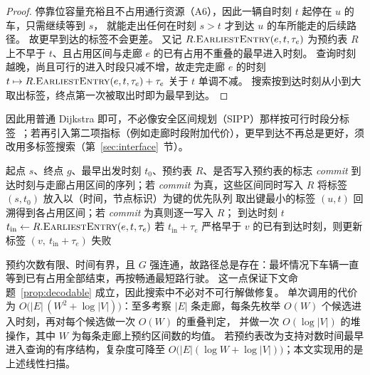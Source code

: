 \documentclass[manuscript,screen,review]{acmart}
\begin{document}
\begin{proof}
  停靠位容量充裕且不占用通行资源（A6），因此一辆自时刻 $t$ 起停在 $u$ 的车，只需继续等到 $s$，
  就能走出任何在时刻 $s>t$ 才到达 $u$ 的车所能走的后续路径。
  故更早到达的标签不会更差。
  又记 $R.\textsc{EarliestEntry}(e,t,\tau_e)$ 为预约表 $R$ 上不早于 $t$、且占用区间与走廊 $e$ 的已有占用不重叠的最早进入时刻。
  查询时刻越晚，尚且可行的进入时段只减不增，故走完走廊 $e$ 的时刻
  $t\mapsto R.\textsc{EarliestEntry}(e,t,\tau_e)+\tau_e$
  关于 $t$ 单调不减。
  搜索按到达时刻从小到大取出标签，终点第一次被取出时即为最早到达。
\end{proof}

因此用普通 Dijkstra 即可，不必像安全区间规划（SIPP）那样按可行时段分标签~\cite{kasaura2022sipp}；若再引入第二项指标（例如走廊时段附加代价），更早到达不再总是更好，须改用多标签搜索（第~\ref{sec:interface}~节）。

\begin{algorithm}[t]
  \caption{\textsc{Route}：无冲突的单段路径规划}
  \label{alg:route}
  \small
  \begin{algorithmic}[1]
  \Require 起点 $s$、终点 $g$、最早出发时刻 $t_0$、预约表 $R$、是否写入预约表的标志 \textit{commit}
  \Ensure 到达时刻与走廊占用区间的序列；若 \textit{commit} 为真，这些区间同时写入 $R$
  \State 将标签 $(s,t_0)$ 放入以（时间，节点标识）为键的优先队列
    \State 取出键最小的标签 $(u,t)$
     \State 回溯得到各占用区间；若 \textit{commit} 为真则逐一写入 $R$；
         \Return 到达时刻 $t$ \EndIf
      \State $t_{\text{in}} \gets R.\textsc{EarliestEntry}(e,t,\tau_e)$
      \State 若 $t_{\text{in}}+\tau_e$ 严格早于 $v$ 的已有到达时刻，则更新标签 $(v,\ t_{\text{in}}+\tau_e)$
    \EndFor
  \EndWhile
  \State \Return 失败 
  \end{algorithmic}
\end{algorithm}

预约次数有限、时间有界，且 $G$ 强连通，故路径总是存在：最坏情况下车辆一直等到已有占用全部结束，再按畅通最短路行驶。
这一点保证下文命题~\ref{prop:decodable} 成立，因此搜索中不必对不可行解做修复。
单次调用的代价为 $O\bigl(|E|\,(W^{2}+\log|V|)\bigr)$：至多考察 $|E|$ 条走廊，每条先枚举 $O(W)$ 个候选进入时刻，再对每个候选做一次 $O(W)$ 的重叠判定，
并做一次 $O(\log|V|)$ 的堆操作，其中 $W$ 为每条走廊上预约区间数的均值。
若预约表改为支持对数时间最早进入查询的有序结构，复杂度可降至 $O\bigl(|E|(\log W+\log|V|)\bigr)$；本文实现用的是上述线性扫描。
\end{document}
